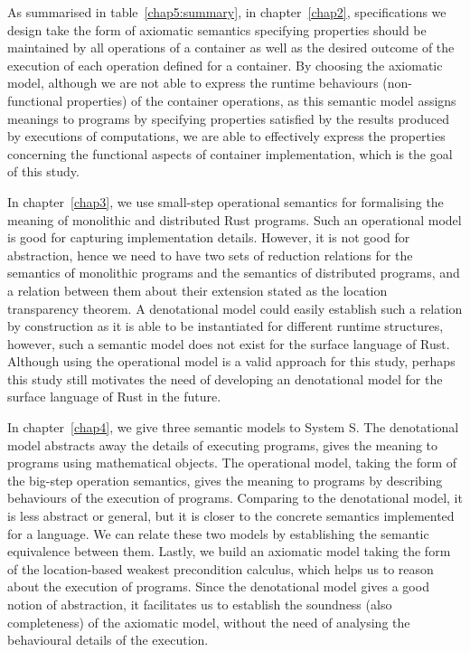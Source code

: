 \begin{highlightnew}
As summarised in table~\ref{chap5:summary}, in chapter~\ref{chap2}, specifications we design take the form of axiomatic semantics specifying properties should be maintained by all operations of a container as well as the desired outcome of the execution of each operation defined for a container. By choosing the axiomatic model, although we are not able to express the runtime behaviours (non-functional properties) of the container operations, as this semantic model assigns meanings to programs by specifying properties satisfied by the results produced by executions of computations, we are able to effectively express the properties concerning the functional aspects of container implementation, which is the goal of this study. 

In chapter~\ref{chap3}, we use small-step operational semantics for formalising the meaning of monolithic and distributed Rust programs. Such an operational model is good for capturing implementation details. However, it is not good for abstraction, hence we need to have two sets of reduction relations for the semantics of monolithic programs and the semantics of distributed programs, and a relation between them about their extension stated as the location transparency theorem. A denotational model could easily establish such a relation by construction as it is able to be instantiated for different runtime structures, however, such a semantic model does not exist for the surface language of Rust. Although using the operational model is a valid approach for this study, perhaps this study still motivates the need of developing an denotational model for the surface language of Rust in the future.

In chapter~\ref{chap4}, we give three semantic models to System S. The denotational model abstracts away the details of executing programs, gives the meaning to programs using mathematical objects. The operational model, taking the form of the big-step operation semantics, gives the meaning to programs by describing behaviours of the execution of programs. Comparing to the denotational model, it is less abstract or general, but it is closer to the concrete semantics implemented for a language. We can relate these two models by establishing the semantic equivalence between them. Lastly, we build an axiomatic model taking the form of the location-based weakest precondition calculus, which helps us to reason about the execution of programs.
Since the denotational model gives a good notion of abstraction, it facilitates us to establish the soundness (also completeness) of the axiomatic model, without the need of analysing the behavioural details of the execution.


\end{highlightnew}

